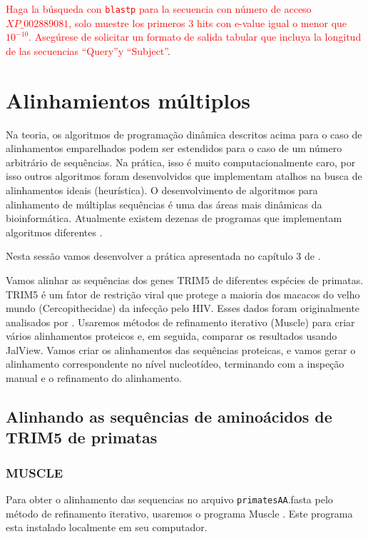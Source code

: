 \documentclass[letter,11pt]{book}
\begin{document}
\textcolor{red}{Haga la búsqueda con \Verb+blastp+ para la secuencia con número de acceso $XP\_002889081$, solo muestre los primeros 3 hits con e-value igual o menor que $10^{-10}$. Asegúrese de solicitar un formato de salida tabular que incluya la longitud de las secuencias ``Query''y ``Subject''}.

\chapter{Alinhamientos múltiplos}

Na teoria, os algoritmos de programação dinâmica descritos acima para o caso de alinhamentos emparelhados podem ser estendidos para o caso de um número arbitrário de sequências. Na prática, isso é muito computacionalmente caro, por isso outros algoritmos foram desenvolvidos que implementam atalhos na busca de alinhamentos ideais (heurística). O desenvolvimento de algoritmos para alinhamento de múltiplas sequências é uma das áreas mais dinâmicas da bioinformática. Atualmente existem dezenas de programas que implementam algoritmos diferentes \citetext{olha\citealp{Notredame2007} e \citealp{Lemey2009} para uma revisão recente do tópico}.

Nesta sessão vamos desenvolver a prática apresentada no capítulo 3 de \citealp{Lemey2009}.

Vamos alinhar as sequências dos genes TRIM5 de diferentes espécies de primatas. TRIM5 é um fator de restrição viral que protege a maioria dos macacos do velho mundo (Cercopithecidae) da infecção pelo HIV. Esses dados foram originalmente analisados por \citealp{Sawyer2005}. Usaremos métodos de refinamento iterativo ({\sc Muscle}) para criar vários alinhamentos proteicos e, em seguida, comparar os resultados usando {\sc JalView}. Vamos criar os alinhamentos das sequências proteicas, e vamos gerar o alinhamento correspondente no nível nucleotídeo, terminando com a inspeção manual e o refinamento do alinhamento.

\section{Alinhando as sequências de aminoácidos de TRIM5 de primatas}

\subsection{{\sc MUSCLE}}

Para obter o alinhamento das sequencias no arquivo \Verb+primatesAA+.fasta pelo método de refinamento iterativo, usaremos o programa {\sc Muscle} \citep{Edgar2004}. Este programa esta instalado localmente em seu computador.
\end{document}
